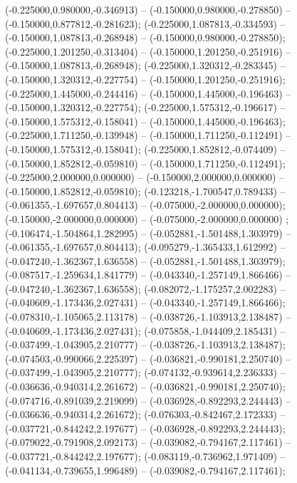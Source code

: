  (-0.225000,0.980000,-0.346913) -- (-0.150000,0.980000,-0.278850) -- (-0.150000,0.877812,-0.281623);
 (-0.225000,1.087813,-0.334593) -- (-0.150000,1.087813,-0.268948) -- (-0.150000,0.980000,-0.278850);
 (-0.225000,1.201250,-0.313404) -- (-0.150000,1.201250,-0.251916) -- (-0.150000,1.087813,-0.268948);
 (-0.225000,1.320312,-0.283345) -- (-0.150000,1.320312,-0.227754) -- (-0.150000,1.201250,-0.251916);
 (-0.225000,1.445000,-0.244416) -- (-0.150000,1.445000,-0.196463) -- (-0.150000,1.320312,-0.227754);
 (-0.225000,1.575312,-0.196617) -- (-0.150000,1.575312,-0.158041) -- (-0.150000,1.445000,-0.196463);
 (-0.225000,1.711250,-0.139948) -- (-0.150000,1.711250,-0.112491) -- (-0.150000,1.575312,-0.158041);
 (-0.225000,1.852812,-0.074409) -- (-0.150000,1.852812,-0.059810) -- (-0.150000,1.711250,-0.112491);
 (-0.225000,2.000000,0.000000) -- (-0.150000,2.000000,0.000000) -- (-0.150000,1.852812,-0.059810);
 (-0.123218,-1.700547,0.789433) -- (-0.061355,-1.697657,0.804413) -- (-0.075000,-2.000000,0.000000);
 (-0.150000,-2.000000,0.000000) -- (-0.075000,-2.000000,0.000000) ;
 (-0.106474,-1.504864,1.282995) -- (-0.052881,-1.501488,1.303979) -- (-0.061355,-1.697657,0.804413);
 (-0.095279,-1.365433,1.612992) -- (-0.047240,-1.362367,1.636558) -- (-0.052881,-1.501488,1.303979);
 (-0.087517,-1.259634,1.841779) -- (-0.043340,-1.257149,1.866466) -- (-0.047240,-1.362367,1.636558);
 (-0.082072,-1.175257,2.002283) -- (-0.040609,-1.173436,2.027431) -- (-0.043340,-1.257149,1.866466);
 (-0.078310,-1.105065,2.113178) -- (-0.038726,-1.103913,2.138487) -- (-0.040609,-1.173436,2.027431);
 (-0.075858,-1.044409,2.185431) -- (-0.037499,-1.043905,2.210777) -- (-0.038726,-1.103913,2.138487);
 (-0.074503,-0.990066,2.225397) -- (-0.036821,-0.990181,2.250740) -- (-0.037499,-1.043905,2.210777);
 (-0.074132,-0.939614,2.236333) -- (-0.036636,-0.940314,2.261672) -- (-0.036821,-0.990181,2.250740);
 (-0.074716,-0.891039,2.219099) -- (-0.036928,-0.892293,2.244443) -- (-0.036636,-0.940314,2.261672);
 (-0.076303,-0.842467,2.172333) -- (-0.037721,-0.844242,2.197677) -- (-0.036928,-0.892293,2.244443);
 (-0.079022,-0.791908,2.092173) -- (-0.039082,-0.794167,2.117461) -- (-0.037721,-0.844242,2.197677);
 (-0.083119,-0.736962,1.971409) -- (-0.041134,-0.739655,1.996489) -- (-0.039082,-0.794167,2.117461);
